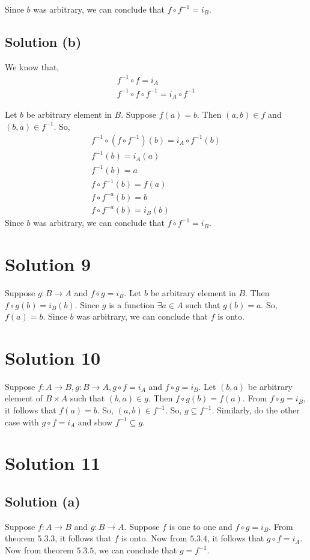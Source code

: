 \documentclass{article}
\begin{document}
Since $b$ was arbitrary, we can conclude that $f \circ f^{-1} = i_B$.

\subsection{Solution (b)}
We know that,
\begin{align*}
  f^{-1} \circ f = i_A \\
  f^{-1} \circ f \circ f^{-1} = i_A \circ f^{-1} 
\end{align*}

Let $b$ be arbitrary element in $B$. Suppose $f(a) = b$. Then $(a,b)
\in f$ and $(b,a) \in f^{-1}$. So,
\begin{align*}
  f^{-1} \circ (f \circ f^{-1})(b) = i_A \circ f^{-1}(b) \\
  f^{-1}(b) = i_A(a) \\
  f^{-1}(b) = a \\
  f \circ f^{-1}(b) = f(a) \tag{Apply f} \\
  f \circ f^{-a} (b) = b \\
  f \circ f^{-a} (b) = i_B(b)
\end{align*}
Since $b$ was arbitrary, we can conclude that $f \circ f^{-1} = i_B$.

\section{Solution 9}
Suppose $g: B \to A$ and $f \circ g = i_B$. Let $b$ be arbitrary
element in $B$. Then $f \circ g(b) = i_B(b)$. Since $g$ is a function
$\exists a \in A$ such that $g(b) = a$. So, $f(a) = b$. Since $b$ was
arbitrary, we can conclude that $f$ is onto.

\section{Solution 10}
Suppose $f: A \to B, g: B \to A, g \circ f = i_A$ and $f \circ g =
i_B$. Let $(b,a)$ be arbitrary element of $B \times A$ such that
$(b,a) \in g$. Then $f \circ g(b) = f(a)$. From $f \circ g = i_B$, it
follows that $f(a) = b$. So, $(a,b) \in f^{-1}$. So, $g \subseteq
f^{-1}$. Similarly, do the other case with $g \circ f = i_A$ and show
$f^{-1} \subseteq g$.

\section{Solution 11}
\subsection{Solution (a)}
Suppose $f:A \to B$ and $g:B \to A$. Suppose $f$ is one to one and $f
\circ g = i_B$. From theorem $5.3.3$, it follows that $f$ is onto. Now
from $5.3.4$, it follows that $g \circ f = i_A$. Now from theorem
$5.3.5$, we can conclude that $g = f^{-1}$.
\end{document}
